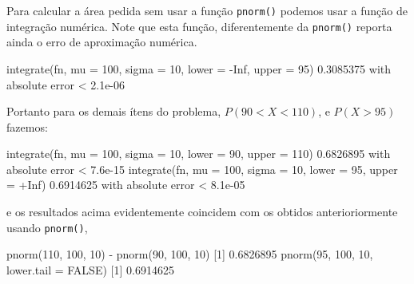 \documentclass[
  10pt,
  a4paper]{book}
\newenvironment{Shaded}{\begin{snugshade}}{\end{snugshade}}
\newcommand{\AttributeTok}[1]{\textcolor[rgb]{0.77,0.63,0.00}{#1}}
\newcommand{\ConstantTok}[1]{\textcolor[rgb]{0.00,0.00,0.00}{#1}}
\newcommand{\DecValTok}[1]{\textcolor[rgb]{0.00,0.00,0.81}{#1}}
\newcommand{\FloatTok}[1]{\textcolor[rgb]{0.00,0.00,0.81}{#1}}
\newcommand{\FunctionTok}[1]{\textcolor[rgb]{0.00,0.00,0.00}{#1}}
\newcommand{\NormalTok}[1]{#1}
\newcommand{\SpecialCharTok}[1]{\textcolor[rgb]{0.00,0.00,0.00}{#1}}
\begin{document}
Para calcular a área pedida sem usar a função \texttt{pnorm()} podemos usar a
função de integração numérica. Note que esta função, diferentemente da
\texttt{pnorm()} reporta ainda o erro de aproximação numérica.

\begin{Shaded}
\begin{Highlighting}[]
\FunctionTok{integrate}\NormalTok{(fn, }\AttributeTok{mu =} \DecValTok{100}\NormalTok{, }\AttributeTok{sigma =} \DecValTok{10}\NormalTok{, }\AttributeTok{lower =} \SpecialCharTok{{-}}\ConstantTok{Inf}\NormalTok{, }\AttributeTok{upper =} \DecValTok{95}\NormalTok{)}
\FloatTok{0.3085375}\NormalTok{ with absolute error }\SpecialCharTok{\textless{}} \FloatTok{2.1e{-}06}
\end{Highlighting}
\end{Shaded}

Portanto para os demais ítens do problema, \(P(90 < X < 110)\), e
\(P(X > 95)\) fazemos:

\begin{Shaded}
\begin{Highlighting}[]
\FunctionTok{integrate}\NormalTok{(fn, }\AttributeTok{mu =} \DecValTok{100}\NormalTok{, }\AttributeTok{sigma =} \DecValTok{10}\NormalTok{, }\AttributeTok{lower =} \DecValTok{90}\NormalTok{, }\AttributeTok{upper =} \DecValTok{110}\NormalTok{)}
\FloatTok{0.6826895}\NormalTok{ with absolute error }\SpecialCharTok{\textless{}} \FloatTok{7.6e{-}15}
\FunctionTok{integrate}\NormalTok{(fn, }\AttributeTok{mu =} \DecValTok{100}\NormalTok{, }\AttributeTok{sigma =} \DecValTok{10}\NormalTok{, }\AttributeTok{lower =} \DecValTok{95}\NormalTok{, }\AttributeTok{upper =} \SpecialCharTok{+}\ConstantTok{Inf}\NormalTok{)}
\FloatTok{0.6914625}\NormalTok{ with absolute error }\SpecialCharTok{\textless{}} \FloatTok{8.1e{-}05}
\end{Highlighting}
\end{Shaded}

e os resultados acima evidentemente coincidem com os obtidos
anterioriormente usando \texttt{pnorm()},

\begin{Shaded}
\begin{Highlighting}[]
\FunctionTok{pnorm}\NormalTok{(}\DecValTok{110}\NormalTok{, }\DecValTok{100}\NormalTok{, }\DecValTok{10}\NormalTok{) }\SpecialCharTok{{-}} \FunctionTok{pnorm}\NormalTok{(}\DecValTok{90}\NormalTok{, }\DecValTok{100}\NormalTok{, }\DecValTok{10}\NormalTok{)}
\NormalTok{[}\DecValTok{1}\NormalTok{] }\FloatTok{0.6826895}
\FunctionTok{pnorm}\NormalTok{(}\DecValTok{95}\NormalTok{, }\DecValTok{100}\NormalTok{, }\DecValTok{10}\NormalTok{, }\AttributeTok{lower.tail =} \ConstantTok{FALSE}\NormalTok{)}
\NormalTok{[}\DecValTok{1}\NormalTok{] }\FloatTok{0.6914625}
\end{Highlighting}
\end{Shaded}
\end{document}
